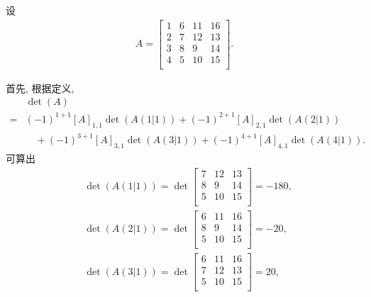 \documentclass[%
    UTF8,%
    fontset=none,%
    punct=kaiming,%
    zihao=-4,%
    a4paper,%
    oneside,%
]{ctexbook}
\begin{document}
\begin{example}
    设
    \begin{align*}
        A =
        \begin{bmatrix}
            1 & 6 & 11 & 16 \\
            2 & 7 & 12 & 13 \\
            3 & 8 & 9  & 14 \\
            4 & 5 & 10 & 15 \\
        \end{bmatrix}.
    \end{align*}

    首先, 根据定义,
    \begin{align*}
             & \det {(A)}                           \\
        = {} & (-1)^{1+1} [A]_{1,1} \det {(A(1|1))}
        + (-1)^{2+1} [A]_{2,1} \det {(A(2|1))}
        \\
             & \quad
        + (-1)^{3+1} [A]_{3,1} \det {(A(3|1))}
        + (-1)^{4+1} [A]_{4,1} \det {(A(4|1))}.
    \end{align*}
    可算出
    \begin{align*}
         & \det {(A(1|1))}
        = \det {\begin{bmatrix}
                        7 & 12 & 13 \\
                        8 & 9  & 14 \\
                        5 & 10 & 15 \\
                    \end{bmatrix}}
        = -180,            \\
         & \det {(A(2|1))}
        = \det {\begin{bmatrix}
                        6 & 11 & 16 \\
                        8 & 9  & 14 \\
                        5 & 10 & 15 \\
                    \end{bmatrix}}
        = -20,             \\
         & \det {(A(3|1))}
        = \det {\begin{bmatrix}
                        6 & 11 & 16 \\
                        7 & 12 & 13 \\
                        5 & 10 & 15 \\
                    \end{bmatrix}}
        = 20,              \\

\end{align*}
\end{example}
\end{document}
